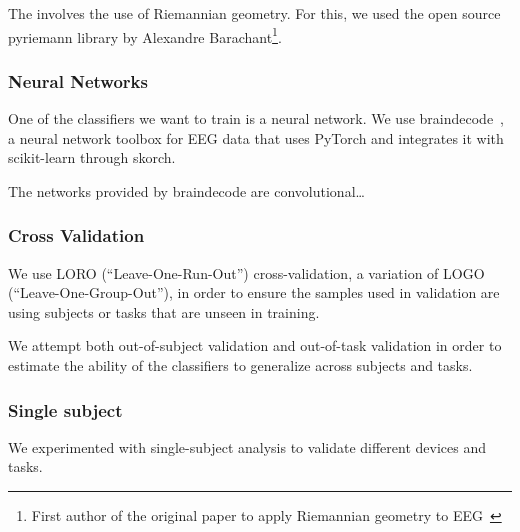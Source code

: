             The  involves the use of Riemannian geometry. For this, we used the open source pyriemann library by Alexandre Barachant\footnote{First author of the original paper to apply Riemannian geometry to EEG~\cite{barachant_classification_2013}}.

    \subsubsection{Neural Networks}

        One of the classifiers we want to train is a neural network. We use braindecode~\cite{schirrmeister_deep_2017}\cite{noauthor_braindecode_2021}, a neural network toolbox for EEG data that uses PyTorch and integrates it with scikit-learn through skorch.

        The networks provided by braindecode are convolutional\ldots

    \subsubsection{Cross Validation}

        We use LORO (``Leave-One-Run-Out'') cross-validation, a variation of LOGO (``Leave-One-Group-Out''), in order to ensure the samples used in validation are using subjects or tasks that are unseen in training.

        We attempt both out-of-subject validation and out-of-task validation in order to estimate the ability of the classifiers to generalize across subjects and tasks.

    \subsubsection{Single subject}

        We experimented with single-subject analysis to validate different devices and tasks.
